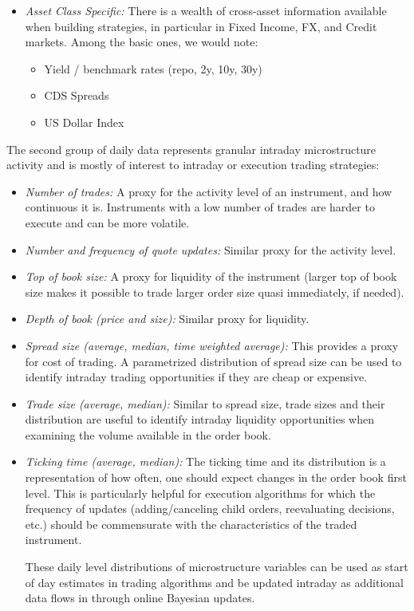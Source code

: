 \begin{itemize}
\item \emph{Asset Class Specific:} There is a wealth of cross-asset information available when building strategies, in particular in Fixed Income, FX, and Credit markets. Among the basic ones, we would note:
        \begin{itemize}
        \item Yield / benchmark rates (repo, 2y, 10y, 30y)
        \item CDS Spreads
        \item US Dollar Index
        \end{itemize}
\end{itemize}


The second group of daily data represents granular intraday microstructure activity and is mostly of interest to intraday or execution trading strategies:
        \begin{itemize}
        \item \emph{Number of trades:} A proxy for the activity level of an instrument, and how continuous it is. Instruments with a low number of trades are harder to execute and can be more volatile. 
        
        \item \emph{Number and frequency of quote updates:} Similar proxy for the activity level.
        
        \item \emph{Top of book size:} A proxy for liquidity of the instrument (larger top of book size makes it possible to trade larger order size quasi immediately, if needed).
        
        \item \emph{Depth of book (price and size):} Similar proxy for liquidity.
        
        \item \emph{Spread size (average, median, time weighted average):} This provides a proxy for cost of trading. A parametrized distribution of spread size can be used to identify intraday trading opportunities if they are cheap or expensive.
        
        \item \emph{Trade size (average, median):} Similar to spread size, trade sizes and their distribution are useful to identify intraday liquidity opportunities when examining the volume available in the order book.
        
        \item \emph{Ticking time (average, median):} The ticking time and its distribution is a representation of how often, one should expect changes in the order book first level. This is particularly helpful for execution algorithms for which the frequency of updates (adding/canceling child orders, reevaluating decisions, etc.) should be commensurate with the characteristics of the traded instrument.
        
        These daily level distributions of microstructure variables can be used as start of day estimates in trading algorithms and be updated intraday as additional data flows in through online Bayesian updates.
        \end{itemize}



